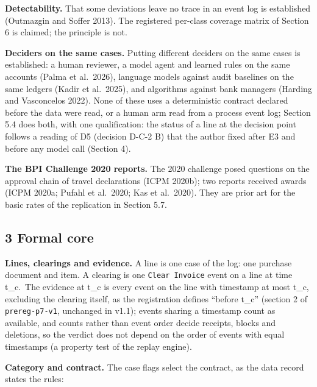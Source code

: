 \documentclass[
  10pt,
]{article}
\begin{document}
\textbf{Detectability.} That some deviations leave no trace in an event
log is established (Outmazgin and Soffer 2013). The registered per-class
coverage matrix of Section 6 is claimed; the principle is not.

\textbf{Deciders on the same cases.} Putting different deciders on the
same cases is established: a human reviewer, a model agent and learned
rules on the same accounts (Palma et al.~2026), language models against
audit baselines on the same ledgers (Kadir et al.~2025), and algorithms
against bank managers (Harding and Vasconcelos 2022). None of these uses
a deterministic contract declared before the data were read, or a human
arm read from a process event log; Section 5.4 does both, with one
qualification: the status of a line at the decision point follows a
reading of D5 (decision D-C-2 B) that the author fixed after E3 and
before any model call (Section 4).

\textbf{The BPI Challenge 2020 reports.} The 2020 challenge posed
questions on the approval chain of travel declarations (ICPM 2020b); two
reports received awards (ICPM 2020a; Pufahl et al.~2020; Kas et
al.~2020). They are prior art for the basic rates of the replication in
Section 5.7.

\hypertarget{formal-core}{%
\subsection{3 Formal core}\label{formal-core}}

\textbf{Lines, clearings and evidence.} A line is one case of the log:
one purchase document and item. A clearing is one
\texttt{Clear\ Invoice} event on a line at time t\_c.~The evidence at
t\_c is every event on the line with timestamp at most t\_c, excluding
the clearing itself, as the registration defines ``before t\_c''
(section 2 of \texttt{prereg-p7-v1}, unchanged in v1.1); events sharing
a timestamp count as available, and counts rather than event order
decide receipts, blocks and deletions, so the verdict does not depend on
the order of events with equal timestamps (a property test of the replay
engine).

\textbf{Category and contract.} The case flags select the contract, as
the data record states the rules:
\end{document}
